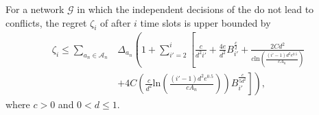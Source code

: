 \begin{theorem}
\label{theo:regret}
For a network $\mathcal{G}$ in which the independent decisions of the \nodes{} do not lead to conflicts, the regret $\zeta_i$ of \name{} after $i$ time slots is upper bounded by
\begin{align*}
    \zeta_i \leq \!\!\sum_{a_n\in \mathcal{A}_n} & \!\!\Delta_{a_n} \!\!\left(1+\sum_{i'=2}^i\left[ \frac{c}{d^2i'} + \frac{4e}{d^2}B_{i'}^{\frac{c}{2}} +  \frac{2Cd^2}{c \mathrm{ln}\left(\frac{(i'-1)d^2e^{0.5}}{cA_n}\right)}\right.\right. \\ 
    & + \left.\left. 4C\left(\frac{c}{d^2}\mathrm{ln}\left(\frac{(i'-1)d^2e^{0.5}}{c A_n}\right)\right) B_{i'}^{\frac{c}{5d^2}} \right]\right),
\end{align*}
where 
$c > 0$ and $0 < d \leq 1$.
\end{theorem}

